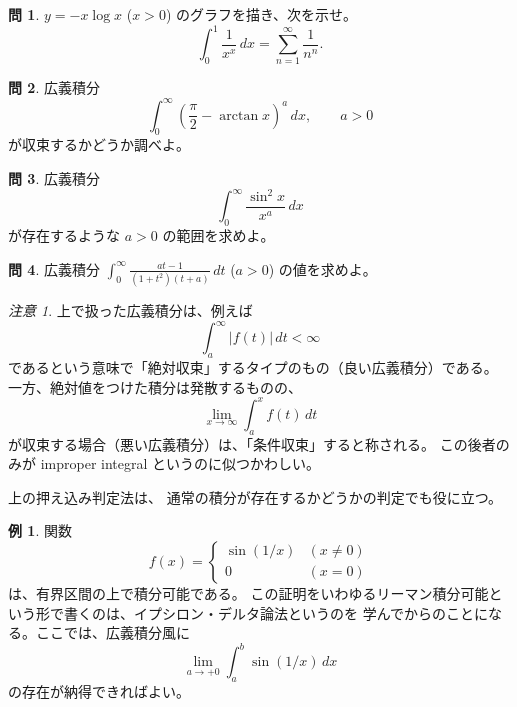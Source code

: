 \documentclass[a4paper]{jsarticle}
\theoremstyle{definition}
\newtheorem{Example}[Theorem]{例}
\newtheorem{Exercise}{問}%
\theoremstyle{remark}
\newtheorem{Remark}{注意}
\begin{document}
\begin{Exercise} $y = -x\log x$ ($x>0$) のグラフを描き、次を示せ。
  \[
    \int_0^1 \frac{1}{x^x}\, dx
    = \sum_{n=1}^\infty \frac{1}{n^n}.
  \]

\end{Exercise}

\begin{Exercise}
広義積分
\[
\int_0^\infty \left( \frac{\pi}{2} - \arctan x\right)^a\,dx, 
\qquad a > 0
\]
が収束するかどうか調べよ。
\end{Exercise}

\begin{Exercise}
広義積分
\[
\int_0^\infty \frac{\sin^2x}{x^a}\, dx
\]
が存在するような $a > 0$ の範囲を求めよ。
\end{Exercise} 

\begin{Exercise}
  広義積分
  $\displaystyle \int_0^\infty \frac{at-1}{(1+t^2)(t+a)}\, dt$ ($a>0$) の値を求めよ。
\end{Exercise}

\begin{Remark}
{\small 
上で扱った広義積分は、例えば
\[
\int_a^\infty |f(t)|\, dt < \infty
\]
であるという意味で「絶対収束」するタイプのもの（良い広義積分）である。
一方、絶対値をつけた積分は発散するものの、
\[
\lim_{x \to \infty} \int_a^x f(t)\, dt
\]
が収束する場合（悪い広義積分）は、「条件収束」すると称される。
この後者のみが improper integral というのに似つかわしい。
}
\end{Remark}

上の押え込み判定法は、%
通常の積分が存在するかどうかの判定でも役に立つ。

\begin{Example}
関数 
\[
f(x) =
\begin{cases}
\sin(1/x) &(x\not= 0)\\
0 &(x=0)
\end{cases}
\]
は、有界区間の上で積分可能である。
この証明をいわゆるリーマン積分可能という形で書くのは、イプシロン・デルタ論法というのを
学んでからのことになる。ここでは、広義積分風に
\[
\lim_{a\to +0} \int_a^b \sin(1/x)\, dx 
\]
の存在が納得できればよい。
\end{Example}
\end{document}
